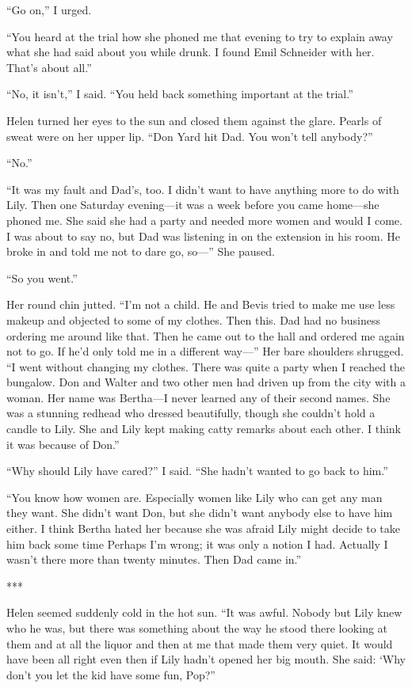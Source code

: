 \documentclass{novel}
\begin{document}
“Go on,” I urged.

“You heard at the trial how she phoned me that evening to try to explain away what she had said about you while drunk. I found Emil Schneider with her. That’s about all.”

“No, it isn’t,” I said. “You held back something important at the trial.”

Helen turned her eyes to the sun and closed them against the glare. Pearls of sweat were on her upper lip. “Don Yard hit Dad. You won’t tell anybody?”

“No.”

“It was my fault and Dad’s, too. I didn’t want to have anything more to do with Lily. Then one Saturday evening—it was a week before you came home—she phoned me. She said she had a party and needed more women and would I come. I was about to say no, but Dad was listening in on the extension in his room. He broke in and told me not to dare go, so—” She paused.

“So you went.”

Her round chin jutted. “I’m not a child. He and Bevis tried to make me use less makeup and objected to some of my clothes. Then this. Dad had no business ordering me around like that. Then he came out to the hall and ordered me again not to go. If he’d only told me in a different way—” Her bare shoulders shrugged. “I went without changing my clothes. There was quite a party when I reached the bungalow. Don and Walter and two other men had driven up from the city with a woman. Her name was Bertha—I never learned any of their second names. She was a stunning redhead who dressed beautifully, though she couldn’t hold a candle to Lily. She and Lily kept making catty remarks about each other. I think it was because of Don.”

“Why should Lily have cared?” I said. “She hadn’t wanted to go back to him.”

“You know how women are. Especially women like Lily who can get any man they want. She didn’t want Don, but she didn’t want anybody else to have him either. I think Bertha hated her because she was afraid Lily might decide to take him back some time Perhaps I’m wrong; it was only a notion I had. Actually I wasn’t there more than twenty minutes. Then Dad came in.”

***

Helen seemed suddenly cold in the hot sun. “It was awful. Nobody but Lily knew who he was, but there was something about the way he stood there looking at them and at all the liquor and then at me that made them very quiet. It would have been all right even then if Lily hadn’t opened her big mouth. She said: ‘Why don’t you let the kid have some fun, Pop?”
\end{document}
